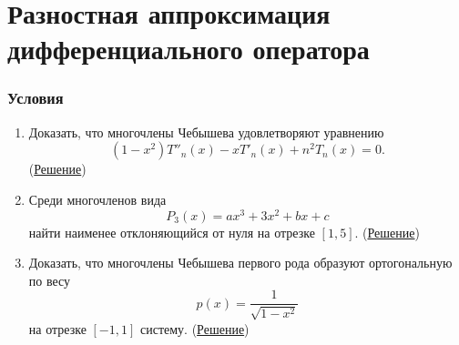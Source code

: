 \documentclass[a4paper, 12pt]{article}
\begin{document}
	\section*{Разностная аппроксимация дифференциального оператора}
	\subsubsection*{Условия}
	\begin{enumerate}
		\item Доказать, что многочлены Чебышева удовлетворяют уравнению $$(1-x^2)T''_n(x) - xT'_n(x) + n^2 T_n(x)=0.$$ (\hyperlink{t1}{Решение})
		\item Среди многочленов вида $$P_3(x) = ax^3 + 3x^2 + bx+c$$ найти наименее отклоняющийся от нуля на отрезке $[1,5]$. (\hyperlink{t2}{Решение})
		\item Доказать, что многочлены Чебышева первого рода образуют ортогональную по весу $$p(x)=\dfrac{1}{\sqrt{1-x^2}}$$ на отрезке $[-1, 1]$ систему. (\hyperlink{t3}{Решение})
	\end{enumerate}
	
	\newpage
\end{document}
